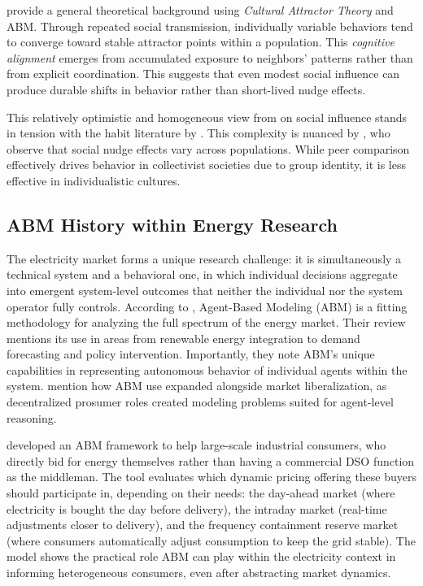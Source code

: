 \documentclass[11pt, a4paper]{article}
\begin{document}
\pagebreak

\noindent\textcite{falandays_emergence_2022} provide a general theoretical background using \textit{Cultural Attractor Theory} and ABM. Through repeated social transmission, individually variable behaviors tend to converge toward stable attractor points within a population. This \textit{cognitive alignment} emerges from accumulated exposure to neighbors' patterns rather than from explicit coordination. This suggests that even modest social influence can produce durable shifts in behavior rather than short-lived nudge effects.

This relatively optimistic and homogeneous view from \textcite{falandays_emergence_2022} on social influence stands in tension with the habit literature by \textcite{haseler_promoting_2024}. This complexity is nuanced by \textcite{mochi_social_2025}, who observe that social nudge effects vary across populations. While peer comparison effectively drives behavior in collectivist societies due to group identity, it is less effective in individualistic cultures.

\subsection{ABM History within Energy Research} \label{subs:abmhistory}

The electricity market forms a unique research challenge: it is simultaneously a technical system and a behavioral one, in which individual decisions aggregate into emergent system-level outcomes that neither the individual nor the system operator fully controls. According to \textcite{mundu_simulation_2024}, Agent-Based Modeling (ABM) is a fitting methodology for analyzing the full spectrum of the energy market. Their review mentions its use in areas from renewable energy integration to demand forecasting and policy intervention. Importantly, they note ABM's unique capabilities in representing autonomous behavior of individual agents within the system. \textcite{fatras_agent-based_2022} mention how ABM use expanded alongside market liberalization, as decentralized prosumer roles created modeling problems suited for agent-level reasoning.

\textcite{fatras_agent-based_2022} developed an ABM framework to help large-scale industrial consumers, who directly bid for energy themselves rather than having a commercial DSO function as the middleman. The tool evaluates which dynamic pricing offering these buyers should participate in, depending on their needs: the day-ahead market (where electricity is bought the day before delivery), the intraday market (real-time adjustments closer to delivery), and the frequency containment reserve market (where consumers automatically adjust consumption to keep the grid stable). The model shows the practical role ABM can play within the electricity context in informing heterogeneous consumers, even after abstracting market dynamics.
\end{document}
